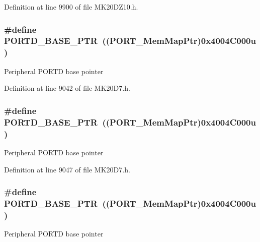 Definition at line 9900 of file M\+K20\+D\+Z10.\+h.

\subsubsection[{\texorpdfstring{P\+O\+R\+T\+D\+\_\+\+B\+A\+S\+E\+\_\+\+P\+TR}{PORTD_BASE_PTR}}]{\setlength{\rightskip}{0pt plus 5cm}\#define P\+O\+R\+T\+D\+\_\+\+B\+A\+S\+E\+\_\+\+P\+TR~(({\bf P\+O\+R\+T\+\_\+\+Mem\+Map\+Ptr})0x4004\+C000u)}\hypertarget{group___p_o_r_t___peripheral_ga7f5a263751543810ebfdbde278383276}{}\label{group___p_o_r_t___peripheral_ga7f5a263751543810ebfdbde278383276}
Peripheral P\+O\+R\+TD base pointer 

Definition at line 9042 of file M\+K20\+D7.\+h.

\subsubsection[{\texorpdfstring{P\+O\+R\+T\+D\+\_\+\+B\+A\+S\+E\+\_\+\+P\+TR}{PORTD_BASE_PTR}}]{\setlength{\rightskip}{0pt plus 5cm}\#define P\+O\+R\+T\+D\+\_\+\+B\+A\+S\+E\+\_\+\+P\+TR~(({\bf P\+O\+R\+T\+\_\+\+Mem\+Map\+Ptr})0x4004\+C000u)}\hypertarget{group___p_o_r_t___peripheral_ga7f5a263751543810ebfdbde278383276}{}\label{group___p_o_r_t___peripheral_ga7f5a263751543810ebfdbde278383276}
Peripheral P\+O\+R\+TD base pointer 

Definition at line 9047 of file M\+K20\+D7.\+h.

\subsubsection[{\texorpdfstring{P\+O\+R\+T\+D\+\_\+\+B\+A\+S\+E\+\_\+\+P\+TR}{PORTD_BASE_PTR}}]{\setlength{\rightskip}{0pt plus 5cm}\#define P\+O\+R\+T\+D\+\_\+\+B\+A\+S\+E\+\_\+\+P\+TR~(({\bf P\+O\+R\+T\+\_\+\+Mem\+Map\+Ptr})0x4004\+C000u)}\hypertarget{group___p_o_r_t___peripheral_ga7f5a263751543810ebfdbde278383276}{}\label{group___p_o_r_t___peripheral_ga7f5a263751543810ebfdbde278383276}
Peripheral P\+O\+R\+TD base pointer 

